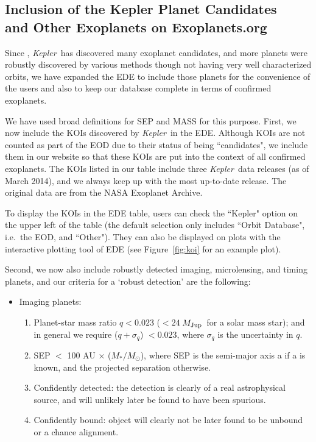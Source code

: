 \documentclass[11pt,preprint]{aastex}
\def\kepler{\textit{Kepler}}
\def\mjup{$M_{\rm Jup}$}
\begin{document}
\begin{CJK*}{UTF8}{gbsn}
\section{Inclusion of the Kepler Planet Candidates \\
  and Other Exoplanets on Exoplanets.org}\label{sec:kepler}

Since \cite{Wright2011}, \kepler\ has discovered many exoplanet
candidates, and more planets were robustly discovered by various
methods though not having very well characterized orbits, we have
expanded the EDE to include those planets for the convenience of
the users and also to keep our database complete in terms of confirmed
exoplanets.

We have used broad definitions for SEP and MASS for this purpose. First, we now include the KOIs discovered by \kepler\ in the
EDE. Although KOIs are not counted as part of the EOD due to their
status of being ``candidates", we include them in our website so that
these KOIs are put into the context of all confirmed exoplanets. The
KOIs listed in our table include three \kepler\ data releases (as of
March 2014), and we always keep up with the most up-to-date
release. The original data are from the NASA Exoplanet Archive.

To display the KOIs in the EDE table, users can check the ``Kepler" option on
the upper left of the table (the default selection only includes ``Orbit
Database", i.e.~the EOD, and ``Other"). They can also be displayed on
plots with the interactive plotting tool of EDE (see
Figure~\ref{fig:koi} for an example plot).

Second, we now also include robustly detected imaging, microlensing,
and timing planets, and our criteria for a `robust detection' are the
following:

\begin{itemize}
\item Imaging planets:
\begin{enumerate}
\item Planet-star mass ratio $q < 0.023$ ($< 24\ $\mjup\ for a solar
  mass star); and in general we require ($q+\sigma_q$) $< 0.023$,
  where $\sigma_q$ is the uncertainty in $q$.
\item SEP $<$ 100 AU $\times$ ($M_*/M_\odot$), where SEP is the
  semi-major axis a if a is known, and the projected separation
  otherwise.
\item Confidently detected: the detection is clearly of a real
  astrophysical source, and will unlikely later be found to have been
  spurious.
\item Confidently bound: object will clearly not
  be later found to be unbound or a chance alignment.


\end{enumerate}
\end{itemize}
\end{CJK*}
\end{document}
